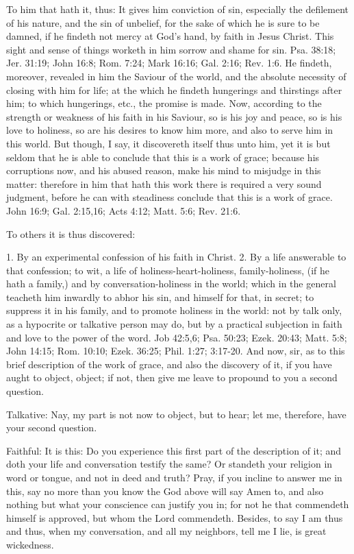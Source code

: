 To him that hath it, thus: It gives him conviction of sin, especially the defilement of his nature, and the sin of unbelief, for the sake of which he is sure to be damned, if he findeth not mercy at God's hand, by faith in Jesus Christ. This sight and sense of things worketh in him sorrow and shame for sin. Psa. 38:18; Jer. 31:19; John 16:8; Rom. 7:24; Mark 16:16; Gal. 2:16; Rev. 1:6. He findeth, moreover, revealed in him the Saviour of the world, and the absolute necessity of closing with him for life; at the which he findeth hungerings and thirstings after him; to which hungerings, etc., the promise is made. Now, according to the strength or weakness of his faith in his Saviour, so is his joy and peace, so is his love to holiness, so are his desires to know him more, and also to serve him in this world. But though, I say, it discovereth itself thus unto him, yet it is but seldom that he is able to conclude that this is a work of grace; because his corruptions now, and his abused reason, make his mind to misjudge in this matter: therefore in him that hath this work there is required a very sound judgment, before he can with steadiness conclude that this is a work of grace. John 16:9; Gal. 2:15,16; Acts 4:12; Matt. 5:6; Rev. 21:6.

To others it is thus discovered:

1. By an experimental confession of his faith in Christ. 2. By a life answerable to that confession; to wit, a life of holiness-heart-holiness, family-holiness, (if he hath a family,) and by conversation-holiness in the world; which in the general teacheth him inwardly to abhor his sin, and himself for that, in secret; to suppress it in his family, and to promote holiness in the world: not by talk only, as a hypocrite or talkative person may do, but by a practical subjection in faith and love to the power of the word. Job 42:5,6; Psa. 50:23; Ezek. 20:43; Matt. 5:8; John 14:15; Rom. 10:10; Ezek. 36:25; Phil. 1:27; 3:17-20. And now, sir, as to this brief description of the work of grace, and also the discovery of it, if you have aught to object, object; if not, then give me leave to propound to you a second question.

Talkative: Nay, my part is not now to object, but to hear; let me, therefore, have your second question.

Faithful: It is this: Do you experience this first part of the description of it; and doth your life and conversation testify the same? Or standeth your religion in word or tongue, and not in deed and truth? Pray, if you incline to answer me in this, say no more than you know the God above will say Amen to, and also nothing but what your conscience can justify you in; for not he that commendeth himself is approved, but whom the Lord commendeth. Besides, to say I am thus and thus, when my conversation, and all my neighbors, tell me I lie, is great wickedness.

